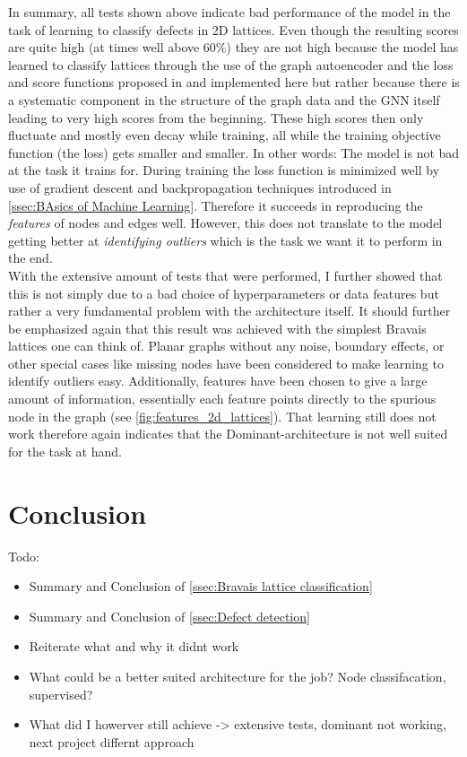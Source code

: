 \documentclass[11pt,a4paper]{article}
\begin{document}
In summary, all tests shown above indicate bad performance of the model in the task of learning to classify defects in 2D lattices. 
Even though the resulting scores are quite high (at times well above 60\%) they are not high because the model has learned to classify lattices through the use of the graph autoencoder and the loss and score functions proposed in \cite{dingDeepAnomalyDetection2019} and implemented here but rather because there is a systematic component in the structure of the graph data and the GNN itself leading to very high scores from the beginning. 
These high scores then only fluctuate and mostly even decay while training, all while the training objective function (the loss) gets smaller and smaller. 
In other words: 
The model is not bad at the task it trains for. 
During training the loss function is minimized well by use of gradient descent and backpropagation techniques introduced in \autoref{ssec:BAsics of Machine Learning}. 
Therefore it succeeds in reproducing the \emph{features} of nodes and edges well. 
However, this does not translate to the model getting better at \emph{identifying outliers} which is the task we want it to perform in the end. \\
With the extensive amount of tests that were performed, I further showed that this is not simply due to a bad choice of hyperparameters or data features but rather a very fundamental problem with the architecture itself. 
It should further be emphasized again that this result was achieved with the simplest Bravais lattices one can think of. 
Planar graphs without any noise, boundary effects, or other special cases like missing nodes have been considered to make learning to identify outliers easy. 
Additionally, features have been chosen to give a large amount of information, essentially each feature points directly to the spurious node in the graph (see \autoref{fig:features_2d_lattices}). 
That learning still does not work therefore again indicates that the Dominant-architecture is not well suited for the task at hand. 


\section{Conclusion}
\label{sec:Conclusion}
Todo:
\begin{itemize}
    \item Summary and Conclusion of \autoref{ssec:Bravais lattice classification}
    \item Summary and Conclusion of \autoref{ssec:Defect detection}
    \item Reiterate what and why it didnt work
    \item What could be a better suited architecture for the job? Node classifacation, supervised?
    \item What did I howerver still achieve -> extensive tests, dominant not working, next project differnt approach
\end{itemize}
\end{document}
